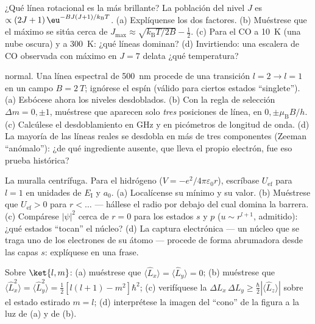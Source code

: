 \begin{exercise}[$\star\star$]\label{exo:b3:quantum-angular-momentum:6}
¿Qué línea rotacional es la más brillante? La población del nivel $J$ es
$\propto (2J+1)\,\eu^{-BJ(J+1)/k_{\text{B}}T}$. (a) Explíquense los dos
factores. (b) Muéstrese que el máximo se sitúa cerca de $J_{\max} \approx
\sqrt{k_{\text{B}}T/2B} - \tfrac12$. (c) Para el CO a \qty{10}{K}
(una nube oscura) y a \qty{300}{K}: ¿qué líneas dominan? (d)
Invirtiendo: una escalera de CO observada con máximo en $J = 7$ delata
¿qué temperatura?
\end{exercise}

\begin{exercise}[$\star\star$]\label{exo:b3:quantum-angular-momentum:7}
 normal. Una línea espectral de \qty{500}{nm} procede de una
transición $l = 2 \to l = 1$ en un campo $B = \qty{2}{T}$; ignórese el
espín (válido para ciertos estados ``singlete''). (a) Esbócese ahora los
niveles desdoblados. (b) Con la regla de selección $\Delta m = 0, \pm1$,
muéstrese que aparecen solo \emph{tres} posiciones de línea, en
$0, \pm\mu_{\text{B}}B/h$. (c) Calcúlese el desdoblamiento en GHz y en
picómetros de longitud de onda. (d) La mayoría de las líneas reales se
desdobla en más de tres componentes (Zeeman ``anómalo''): ¿de qué
ingrediente ausente, que lleva el propio electrón, fue eso prueba histórica?
\end{exercise}

\begin{exercise}[$\star\star$]\label{exo:b3:quantum-angular-momentum:8}
La muralla centrífuga. Para el hidrógeno ($V = -e^2/4\pi\varepsilon_0r$),
escríbase $U_{\text{ef}}$ para $l = 1$ en unidades de $E_{\text{I}}$ y
$a_0$. (a) Localícense su mínimo y su valor. (b) Muéstrese que $U_{\text{ef}} >
0$ para $r < \dots$ --- hállese el radio por debajo del cual domina la
barrera. (c) Compárese $|\psi|^2$ cerca de $r = 0$ para los estados $s$ y
$p$ ($u \sim r^{l+1}$, admitido): ¿qué estados ``tocan'' el
núcleo? (d) La captura electrónica --- un núcleo que se traga uno de los
electrones de su átomo --- procede de forma abrumadora desde las capas $s$:
explíquese en una frase.
\end{exercise}

\begin{exercise}[$\star\star$]\label{exo:b3:quantum-angular-momentum:9}
Sobre $\ket{l, m}$: (a) muéstrese que $\langle\hat L_x\rangle = \langle\hat
L_y\rangle = 0$; (b) muéstrese que $\langle\hat L_x^2\rangle = \langle\hat
L_y^2\rangle = \tfrac12[l(l+1) - m^2]\hbar^2$; (c) verifíquese la
 $\Delta L_x\,\Delta L_y \ge \tfrac\hbar2
|\langle\hat L_z\rangle|$ sobre el estado estirado $m = l$; (d)
interprétese la imagen del ``cono'' de la figura a la luz de (a) y
de (b).
\end{exercise}

